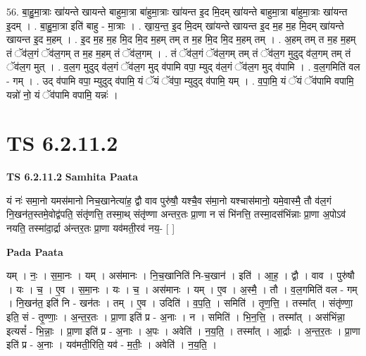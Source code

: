 \documentclass[17pt]{extarticle}
\begin{document}
56. बा॒हु॒मा॒त्राः खा॑यन्ते खायन्ते बाहुमा॒त्रा बा॑हुमा॒त्राः खा॑यन्त इ॒द मि॒दम् खा॑यन्ते बाहुमा॒त्रा बा॑हुमा॒त्राः खा॑यन्त इ॒दम् । . बा॒हु॒मा॒त्रा इति॑ बाहु - मा॒त्राः । . खा॒य॒न्त॒ इ॒द मि॒दम् खा॑यन्ते खायन्त इ॒द म॒ह म॒ह मि॒दम् खा॑यन्ते खायन्त इ॒द म॒हम् । . इ॒द म॒ह म॒ह मि॒द मि॒द म॒हम् तम् त म॒ह मि॒द मि॒द म॒हम् तम् । . अ॒हम् तम् त म॒ह म॒हम् तं ॅव॑ल॒गं ॅव॑ल॒गम् त म॒ह म॒हम् तं ॅव॑ल॒गम् । . तं ॅव॑ल॒गं ॅव॑ल॒गम् तम् तं ॅव॑ल॒ग मुदुद् व॑ल॒गम् तम् तं ॅव॑ल॒ग मुत् । . व॒ल॒ग मुदुद् व॑ल॒गं ॅव॑ल॒ग मुद् व॑पामि वपा॒ म्युद् व॑ल॒गं ॅव॑ल॒ग मुद् व॑पामि । . व॒ल॒गमिति॑ वल - गम् । . उद् व॑पामि वपा॒ म्युदुद् व॑पामि॒ यं ॅयं ॅव॑पा॒ म्युदुद् व॑पामि॒ यम् । . व॒पा॒मि॒ यं ॅयं ॅव॑पामि वपामि॒ यन्नो॑ नो॒ यं ॅव॑पामि वपामि॒ यन्नः॑ । \newline
\pagebreak
{}

\section{ TS 6.2.11.2 }

\textbf{TS 6.2.11.2 } \newline
\textbf{Samhita Paata} \newline

यं नः॑ समा॒नो यमस॑मानो निच॒खानेत्या॑ह॒ द्वौ वाव पुरु॑षौ॒ यश्चै॒व स॑मा॒नो यश्चास॑मानो॒ यमे॒वास्मै॒ तौ व॑ल॒गं नि॒खन॑त॒स्तमे॒वोद्व॑पति॒ संतृ॑णत्ति॒ तस्मा॒थ् संतृ॑ण्णा अन्तर॒तः प्रा॒णा न सं भि॑नत्ति॒ तस्मा॒दस॑भिंन्नाः प्रा॒णा अ॒पोऽव॑ नयति॒ तस्मा॑दा॒र्द्रा अ॑न्तर॒तः प्रा॒णा यव॑मती॒रव॑ नय॒- [  ] \newline

\textbf{Pada Paata} \newline

यम् । नः॒ । स॒मा॒नः । यम् । अस॑मानः । नि॒च॒खानिति॑ नि-च॒खान॑ । इति॑ । आ॒ह॒ । द्वौ । वाव । पुरु॑षौ । यः । च॒ । ए॒व । स॒मा॒नः । यः । च॒ । अस॑मानः । यम् । ए॒व । अ॒स्मै॒ । तौ । व॒ल॒गमिति॑ वल - गम् । नि॒खन॑त॒ इति॑ नि - खन॑तः । तम् । ए॒व । उदिति॑ । व॒प॒ति॒ । समिति॑ । तृ॒ण॒त्ति॒ । तस्मा᳚त् । संतृ॑ण्णा॒ इति॒ सं - तृ॒ण्णाः॒ । अ॒न्त॒र॒तः । प्रा॒णा इति॑ प्र - अ॒नाः । न । समिति॑ । भि॒न॒त्ति॒ । तस्मा᳚त् । अस॑भिंन्ना॒ इत्यसं᳚ - भि॒न्नाः॒ । प्रा॒णा इति॑ प्र - अ॒नाः । अ॒पः । अवेति॑ । न॒य॒ति॒ । तस्मा᳚त् । आ॒र्द्राः । अ॒न्त॒र॒तः । प्रा॒णा इति॑ प्र - अ॒नाः । यव॑मती॒रिति॒ यव॑ - म॒तीः॒ । अवेति॑ । न॒य॒ति॒ ।  \newline
\end{document}
